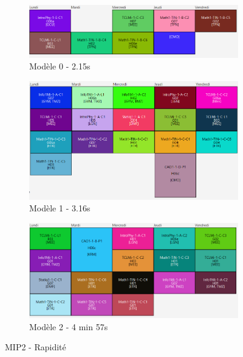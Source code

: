 \begin{figure}[H]
    \begin{subfigure}{0.3\linewidth}
        \centering
        \includegraphics[width=\linewidth]{./assets/figures/perfMIP2const0_2.15.png}
        \caption{Modèle 0 - 2.15s}
    \end{subfigure}
    \hfill
    \begin{subfigure}{0.3\linewidth}
        \centering
        \includegraphics[width=\linewidth]{./assets/figures/perfMIP2const1_3.16.png}
        \caption{Modèle 1 - 3.16s}
    \end{subfigure}
    \hfill
    \begin{subfigure}{0.3\linewidth}
        \centering
        \includegraphics[width=\linewidth]{./assets/figures/perfMIP2const2_297.png}
        \caption{Modèle 2 - 4 min 57s}
    \end{subfigure}
    \caption{MIP2 - Rapidité}
\end{figure}


